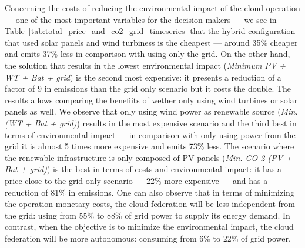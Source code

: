 Concerning the costs of reducing the environmental impact of the cloud operation --- one of the most important variables for the decision-makers --- we see in Table~\ref {tab:total_price_and_co2_grid_timeseries} that the hybrid configuration that used solar panels and wind turbiness is the cheapest ---  around 35\% cheaper and emits 37\% less  in comparison with using only the grid.  On the other hand, the solution that results in the lowest environmental impact (\textit{Minimum  PV + WT + Bat + grid}) is the second most expensive: it presents a reduction of a factor of 9 in  emissions than the grid only scenario but it costs the double. The results allows comparing the benefiits of wether only using wind turbines or solar panels as well. We observe that only using wind power as renewable source (\textit{Min.  (WT + Bat + grid)}) results in the most expensive scenario and the third best in terms of environmental impact --- in comparison with only using power from the grid it is almost 5 times more expensive and emits 73\% less. The scenario where the renewable infrastructure is only composed of PV panels (\textit{Min. CO 2 (PV + Bat + grid)}) is the best in terms of costs and environmental impact: it has a price close to the grid-only scenario --- 22\% more expensive --- and has a reduction of 81\% in  emissions. One can also observe that in terms of minimizing the operation monetary costs, the cloud federation will be less independent from the grid: using from 55\% to 88\% of grid power to supply its energy demand. In contrast, when the objective is to minimize the environmental impact, the cloud federation will be more autonomous: consuming from 6\% to 22\% of grid power. 

